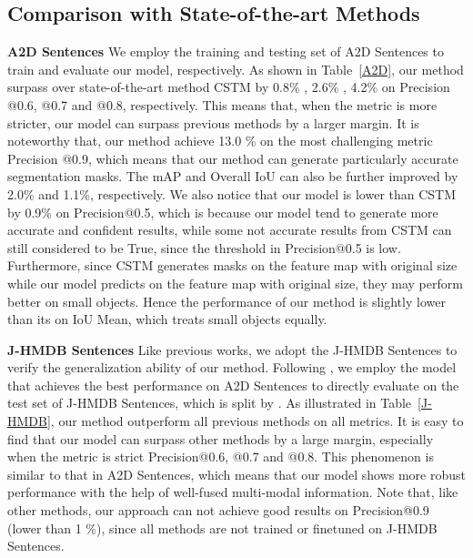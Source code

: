 \documentclass[10pt,twocolumn,letterpaper]{article}
\begin{document}
\vspace{-1mm}
\subsection{Comparison with State-of-the-art Methods}
\vspace{-1mm}
\noindent\textbf{A2D Sentences}
We employ the training and testing set of A2D Sentences to train and evaluate our model, respectively. As shown in Table~\ref{A2D}, our method surpass over state-of-the-art method CSTM by 0.8\% , 2.6\% , 4.2\% on Precision @0.6, @0.7 and @0.8, respectively. This means that, when the metric is more stricter, our model can surpass previous methods by a larger margin.  It is noteworthy that, our method achieve 13.0 \% on the most challenging metric Precision @0.9, which means that our method can generate particularly accurate segmentation masks. The mAP and Overall IoU can also be further improved by 2.0\% and 1.1\%, respectively. We also notice that our model is lower than CSTM \cite{hui2021collaborative} by 0.9\% on Precision@0.5, which is because our model tend to generate more accurate and confident results, while some not accurate results from CSTM \cite{hui2021collaborative} can still considered to be True, since the threshold in Precision@0.5 is low. Furthermore, since CSTM generates masks on the feature map with original size while our model predicts on the feature map with  original size, they may perform better on small objects. Hence the performance of our method is slightly lower than its on IoU Mean, which treats small objects equally. 

\noindent\textbf{J-HMDB Sentences}
Like previous works, we adopt the J-HMDB Sentences to verify the generalization ability of our method. Following \cite{wang2019asymmetric, hui2021collaborative}, we employ the model that achieves the best performance on A2D Sentences to directly evaluate on the test set of J-HMDB Sentences, which is split by \cite{gavrilyuk2018actor}. As illustrated in Table~\ref{J-HMDB}, our method outperform all previous methods on all metrics. It is easy to find that our model can surpass other methods by a large margin, especially when the metric is strict \eg Precision@0.6, @0.7 and @0.8. This phenomenon is similar to that in A2D Sentences, which means that our model shows more robust performance with the help of well-fused multi-modal information. Note that, like other methods, our approach can not achieve good results on Precision@0.9 (lower than 1 \%), since all methods are not trained or finetuned on J-HMDB Sentences. 
\end{document}
